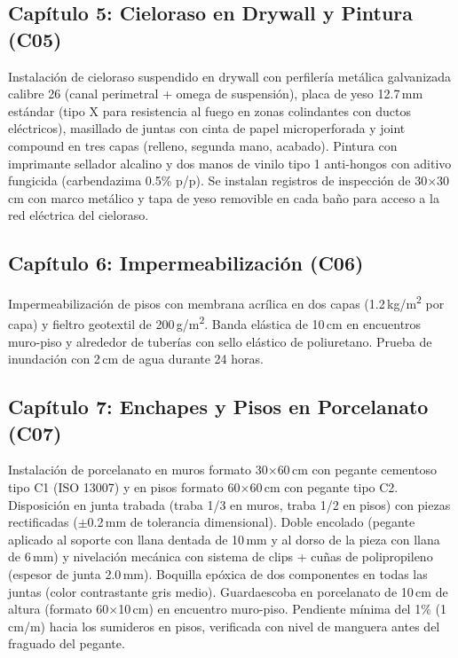 ﻿\documentclass[12pt]{article}
\begin{document}
\subsection{Capítulo 5: Cieloraso en Drywall y Pintura (C05)}

Instalación de cieloraso suspendido en drywall con perfilería metálica
galvanizada calibre 26 (canal perimetral + omega de suspensión), placa de yeso
12.7\,mm estándar (tipo X para resistencia al fuego en zonas colindantes con
ductos eléctricos), masillado de juntas con cinta de papel microperforada y
joint compound en tres capas (relleno, segunda mano, acabado). Pintura con
imprimante sellador alcalino y dos manos de vinilo tipo 1 anti-hongos con
aditivo fungicida (carbendazima 0.5\% p/p). Se instalan registros de
inspección de 30$\times$30\,cm con marco metálico y tapa de yeso removible
en cada baño para acceso a la red eléctrica del cieloraso.

\subsection{Capítulo 6: Impermeabilización (C06)}

Impermeabilización de pisos con membrana acrílica en dos capas (1.2\,kg/m\textsuperscript{2} por
capa) y fieltro geotextil de 200\,g/m\textsuperscript{2}. Banda elástica de 10\,cm en encuentros
muro-piso y alrededor de tuberías con sello elástico de poliuretano. Prueba de inundación con
2\,cm de agua durante 24 horas.

\subsection{Capítulo 7: Enchapes y Pisos en Porcelanato (C07)}

Instalación de porcelanato en muros formato 30$\times$60\,cm con pegante
cementoso tipo C1 (ISO 13007) y en pisos formato 60$\times$60\,cm con pegante
tipo C2. Disposición en junta trabada (traba 1/3 en muros, traba 1/2 en pisos)
con piezas rectificadas ($\pm$0.2\,mm de tolerancia dimensional). Doble
encolado (pegante aplicado al soporte con llana dentada de 10\,mm y al dorso
de la pieza con llana de 6\,mm) y nivelación mecánica con sistema de clips +
cuñas de polipropileno (espesor de junta 2.0\,mm). Boquilla epóxica de dos
componentes en todas las juntas (color contrastante gris medio). Guardaescoba
en porcelanato de 10\,cm de altura (formato 60$\times$10\,cm) en encuentro
muro-piso. Pendiente mínima del 1\% (1\,cm/m) hacia los sumideros en pisos,
verificada con nivel de manguera antes del fraguado del pegante.
\end{document}

